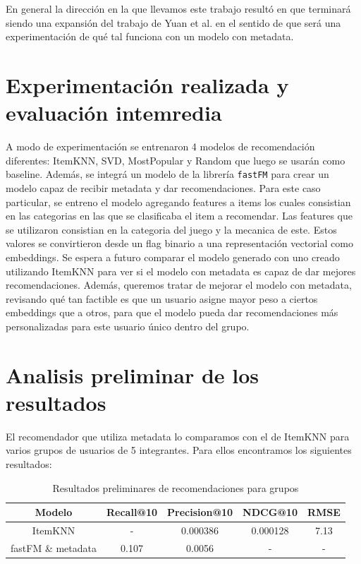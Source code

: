 \documentclass[11pt]{article}
\begin{document}
En general la dirección en la que llevamos este trabajo resultó en que terminará siendo una expansión del trabajo de Yuan et al. en el sentido de que será una experimentación de qué tal funciona con un modelo con metadata.

\section{Experimentación realizada y evaluación intemredia}
A modo de experimentación se entrenaron 4 modelos de recomendación diferentes: ItemKNN, SVD, MostPopular y Random que luego se usarán como baseline.
Además, se integrá un modelo de la librería \texttt{fastFM} para crear un modelo capaz de recibir metadata y dar recomendaciones.
Para este caso particular, se entreno el modelo agregando features a items los cuales consistian en las categorias en las que se clasificaba el item a recomendar. Las features que se utilizaron 
consistian en la categoria del juego y la mecanica de este. Estos valores se convirtieron desde un flag binario a una representación vectorial como embeddings.
Se espera a futuro comparar el modelo generado con uno creado utilizando ItemKNN para ver si el modelo con metadata es capaz de dar mejores recomendaciones.
Además, queremos tratar de mejorar el modelo con metadata, revisando qué tan factible es que un usuario asigne mayor peso a ciertos embeddings que a otros, para que el modelo pueda dar recomendaciones más personalizadas para este usuario único dentro del grupo.

\section{Analisis preliminar de los resultados}
El recomendador que utiliza metadata lo comparamos con el de ItemKNN para varios grupos de usuarios de 5 integrantes. Para ellos encontramos los siguientes resultados:

\begin{table}[H]
    \centering
    \begin{tabular}{|c|c|c|c|c|}
        \hline
        \textbf{Modelo} & \textbf{Recall@10} & \textbf{Precision@10} & \textbf{NDCG@10} & \textbf{RMSE} \\ \hline
        ItemKNN & - & 0.000386 & 0.000128 & 7.13 \\ \hline
        fastFM \& metadata & 0.107 & 0.0056 & - & - \\ \hline
    \end{tabular}
    \caption{Resultados preliminares de recomendaciones para grupos}
    \label{tab:resultados_preliminares}
\end{table}
\end{document}
